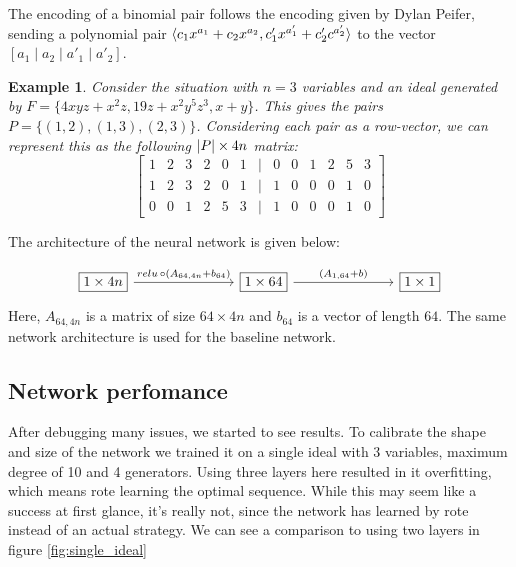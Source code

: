 \documentclass{article}
\theoremstyle{changedot}
\theoremstyle{changedotbreak}
\theoremstyle{nonumberplain}
\newtheorem{example}{Example}
\DeclarePairedDelimiter{\tuple}{\langle}{\rangle}
\DeclarePairedDelimiter{\abs}{\lvert}{\rvert}
\newcommand{\card}[1]{\abs{#1}}
\begin{document}
The encoding of a binomial pair follows the encoding given by Dylan Peifer, sending a polynomial pair $\tuple{c_{1}x^{a_{1}} + c_{2}x^{a_{2}}, c'_{1}x^{a'_{1}} + c'_{2} c^{a'_{2}}}$ to the vector $[a_{1} \mid a_{2} \mid a'_{1} \mid a'_{2}]$.

\begin{example}
  Consider the situation with $n=3$ variables and an ideal generated by $F = \{4xyz + x^{2}z, 19z + x^{2}y^{5}z^{3}, x + y\}$. This gives the pairs $P = \{(1, 2), (1, 3), (2, 3)\}$. Considering each pair as a row-vector, we can represent this as the following $\card P \times 4n$ matrix:
  \[\begin{bmatrix}
      1 & 2 & 3 & 2 & 0 & 1 &\mid & 0 & 0 & 1 & 2 & 5 & 3 \\
      1 & 2 & 3 & 2 & 0 & 1 &\mid & 1 & 0 & 0 & 0 & 1 & 0 \\
      0 & 0 & 1 & 2 & 5 & 3 &\mid & 1 & 0 & 0 & 0 & 1 & 0
    \end{bmatrix}\]
\end{example}

The architecture of the neural network is given below:

\[\begin{tikzcd}
	{\boxed{1 \times 4n}} &&& {\boxed{1 \times 64}} &&& {\boxed{1\times1}}
	\arrow["{relu \,\circ (A_{64, 4n} + b_{64})}", from=1-1, to=1-4]
	\arrow["{(A_{1, 64} + b)}", from=1-4, to=1-7]
\end{tikzcd}\]
Here, $A_{64, 4n}$ is a matrix of size $64 \times 4n$ and $b_{64}$ is a vector of length $64$. The same network architecture is used for the baseline network.

\subsection{Network perfomance}
After debugging many issues, we started to see results. To calibrate the shape and size of the network we trained it on a single ideal with 3 variables, maximum degree of 10 and 4 generators. Using three layers here resulted in it overfitting, which means rote learning the optimal sequence. While this may seem like a success at first glance, it's really not, since the network has learned by rote instead of an actual strategy. We can see a comparison to using two layers in figure \ref{fig:single_ideal}
\end{document}
